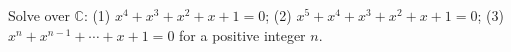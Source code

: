 Solve over $\mathbb C$: (1) $x^4+x^3+x^2+x+1=0$; (2) $x^5+x^4+x^3+x^2+x+1=0$; (3) $x^n+x^{n-1}+\cdots+x+1=0$ for a positive integer $n$.
